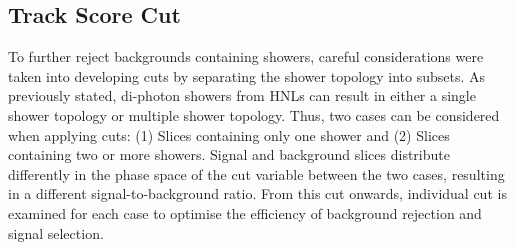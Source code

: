 \subsection{Track Score Cut}

To further reject backgrounds containing showers, careful considerations were taken into developing cuts by separating the shower topology into subsets.
As previously stated, di-photon showers from HNLs can result in either a single shower topology or multiple shower topology.
Thus, two cases can be considered when applying cuts: (1) Slices containing only one shower and (2) Slices containing two or more showers.
Signal and background slices distribute differently in the phase space of the cut variable between the two cases, resulting in a different signal-to-background ratio.
From this cut onwards, individual cut is examined for each case to optimise the efficiency of background rejection and signal selection. 

